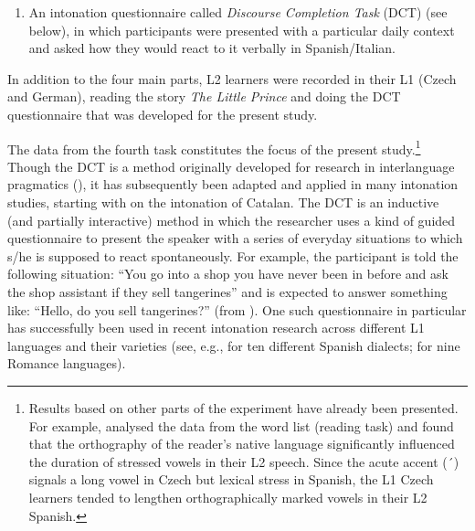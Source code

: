 \begin{enumerate}[label={(\arabic*)}]
\item
          An intonation questionnaire called \textit{Discourse Completion Task} (DCT) (see below), in which participants were presented with a particular daily context and asked how they would react to it verbally in Spanish/Italian.
\end{enumerate}


In addition to the four main parts, L2 learners were recorded in their L1 (Czech and German), reading the story \textit{The Little Prince} and doing the DCT questionnaire that was developed for the present study.



The data from the fourth task constitutes the focus of the present study.\footnote{Results based on other parts of the experiment have already been presented. For example, \citet{PeškováEtAl2017} analysed the data from the word list (reading task) and found that the orthography of the reader’s native language significantly influenced the duration of stressed vowels in their L2 speech. Since the acute accent (´) signals a long vowel in Czech but lexical stress in Spanish, the L1 Czech learners tended to lengthen orthographically marked vowels in their L2 Spanish.} Though the DCT is a method originally developed for research in interlanguage pragmatics (\citealt{Blum-KulkaEtAl1989, KasperDahl1991, Félix-Brasdefer2010}), it has subsequently been adapted and applied in many intonation studies, starting with \citet{Prieto2001} on the intonation of Catalan. The DCT is an inductive (and partially interactive) method in which the researcher uses a kind of guided questionnaire to present the speaker with a series of everyday situations to which s/he is supposed to react spontaneously. For example, the participant is told the following situation: “You go into a shop you have never been in before and ask the shop assistant if they sell tangerines” and is expected to answer something like: “Hello, do you sell tangerines?” (from \citealt{PrietoRoseano2009-2013}). One such questionnaire in particular has successfully been used in recent intonation research across different L1 languages and their varieties (see, e.g., \citealt{PrietoRoseano2010} for ten different Spanish dialects; \citealt{FrotaPrieto2015} for nine Romance languages).



